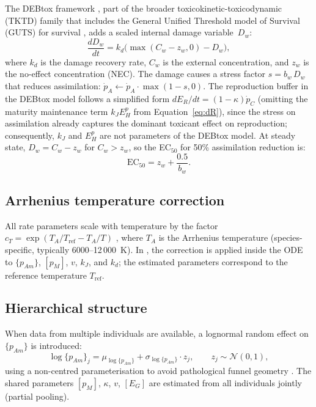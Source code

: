 \documentclass[article,shortnames]{jss}
\newcommand{\pAm}{\{p_{Am}\}}
\newcommand{\pM}{[p_M]}
\newcommand{\EG}{[E_G]}
\begin{document}
The DEBtox framework \citep{JagerDEBtox2006, JagerZimmer2012}, part
of the broader toxicokinetic-toxicodynamic (TKTD) family that includes
the General Unified Threshold model of Survival (GUTS) for survival
\citep{JagerGUTS2011}, adds a scaled internal damage variable~$D_w$:
\begin{equation}
  \frac{dD_w}{dt} = k_d \bigl(\max(C_w - z_w, 0) - D_w\bigr),
    \label{eq:Dw}
\end{equation}
where $k_d$ is the damage recovery rate, $C_w$ is the external
concentration, and $z_w$ is the no-effect concentration (NEC).  The
damage causes a stress factor $s = b_w \, D_w$ that reduces
assimilation: $\dot{p}_A \leftarrow \dot{p}_A \cdot \max(1 - s, 0)$.
The reproduction buffer in the DEBtox model follows a simplified form
$dE_R/dt = (1 - \kappa)\dot{p}_C$ (omitting the maturity maintenance
term $k_J E_H^p$ from Equation~\ref{eq:dR}), since the stress on
assimilation already captures the dominant toxicant effect on
reproduction; consequently, $k_J$ and $E_H^p$ are not parameters of
the DEBtox model.
At steady state, $D_w = C_w - z_w$ for $C_w > z_w$, so the
EC$_{50}$ for 50\% assimilation reduction is:
\begin{equation}
  \mathrm{EC}_{50} = z_w + \frac{0.5}{b_w}.
    \label{eq:EC50}
\end{equation}

\subsection{Arrhenius temperature correction} \label{sec:arrhenius}

All rate parameters scale with temperature by the factor
$c_T = \exp(T_A / T_{\mathrm{ref}} - T_A / T)$
\citep[Eq.~1.2]{Kooijman2010}, where $T_A$ is the Arrhenius
temperature (species-specific, typically 6000--12\,000~K).  In
, the correction is applied inside the
 ODE to $\pAm$, $\pM$, $v$, $k_J$, and $k_d$;
the estimated parameters correspond to the reference temperature
$T_{\mathrm{ref}}$.

\subsection{Hierarchical structure} \label{sec:hierarchical}

When data from multiple individuals are available, a lognormal random
effect on $\pAm$ is introduced:
\begin{equation}
  \log \pAm_j = \mu_{\log \pAm} + \sigma_{\log \pAm} \cdot z_j,
  \qquad z_j \sim \mathcal{N}(0, 1),
    \label{eq:hier}
\end{equation}
using a non-centred parameterisation to avoid pathological funnel
geometry \citep{BetancourtHierarchical2015}.
The shared parameters $\pM$, $\kappa$, $v$, $\EG$ are estimated from
all individuals jointly (partial pooling).
\end{document}
